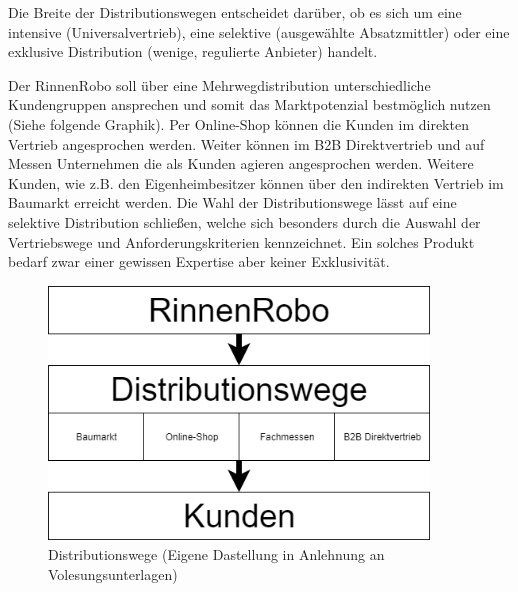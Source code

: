     \noindent
    Die Breite der Distributionswegen entscheidet darüber, ob es sich um eine intensive (Universalvertrieb), eine
    selektive (ausgewählte Absatzmittler) oder eine exklusive Distribution (wenige, regulierte Anbieter) handelt.

    \noindent
    Der RinnenRobo soll über eine Mehrwegdistribution unterschiedliche Kundengruppen ansprechen und somit das
    Marktpotenzial bestmöglich nutzen (Siehe folgende Graphik). Per Online-Shop können die Kunden im direkten Vertrieb
    angesprochen werden. Weiter können im B2B Direktvertrieb und auf Messen Unternehmen die als Kunden agieren
    angesprochen werden. Weitere Kunden, wie z.B. den Eigenheimbesitzer können über den indirekten Vertrieb im Baumarkt
    erreicht werden. Die Wahl der Distributionswege lässt auf eine selektive Distribution schließen, welche sich
    besonders durch die Auswahl der Vertriebswege und Anforderungskriterien kennzeichnet. Ein solches Produkt bedarf
    zwar einer gewissen Expertise aber keiner Exklusivität.

     \begin{figure}[ht]
        \centering
        \includegraphics[width = 0.9\textwidth]{Eigene Darstellungen/Distributionswege1.png}

        \caption{Distributionswege (Eigene Dastellung in Anlehnung an Volesungsunterlagen)}
     \end{figure}